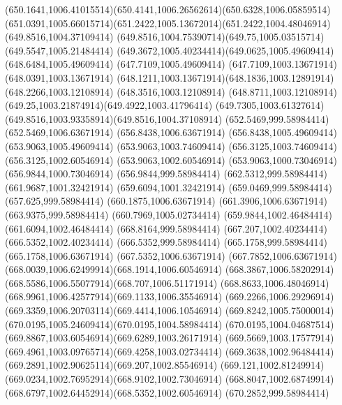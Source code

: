 {{	\curveto(650.1641,1006.41015514)(650.4141,1006.26562614)(650.6328,1006.05859514)
	\curveto(651.0391,1005.66015714)(651.2422,1005.13672014)(651.2422,1004.48046914)
	\closepath
	\moveto(649.8516,1004.37109414)
	\curveto(649.8516,1004.75390714)(649.75,1005.03515714)(649.5547,1005.21484414)
	\curveto(649.3672,1005.40234414)(649.0625,1005.49609414)(648.6484,1005.49609414)
	\lineto(647.7109,1005.49609414)
	\lineto(647.7109,1003.13671914)
	\lineto(648.0391,1003.13671914)
	\curveto(648.1211,1003.13671914)(648.1836,1003.12891914)(648.2266,1003.12108914)
	\lineto(648.3516,1003.12108914)
	\curveto(648.8711,1003.12108914)(649.25,1003.21874914)(649.4922,1003.41796414)
	\curveto(649.7305,1003.61327614)(649.8516,1003.93358914)(649.8516,1004.37108914)
	\closepath
	\moveto(652.5469,999.58984414)
	\lineto(652.5469,1006.63671914)
	\lineto(656.8438,1006.63671914)
	\lineto(656.8438,1005.49609414)
	\lineto(653.9063,1005.49609414)
	\lineto(653.9063,1003.74609414)
	\lineto(656.3125,1003.74609414)
	\lineto(656.3125,1002.60546914)
	\lineto(653.9063,1002.60546914)
	\lineto(653.9063,1000.73046914)
	\lineto(656.9844,1000.73046914)
	\lineto(656.9844,999.58984414)
	\closepath
	\moveto(662.5312,999.58984414)
	\lineto(661.9687,1001.32421914)
	\lineto(659.6094,1001.32421914)
	\lineto(659.0469,999.58984414)
	\lineto(657.625,999.58984414)
	\lineto(660.1875,1006.63671914)
	\lineto(661.3906,1006.63671914)
	\lineto(663.9375,999.58984414)
	\closepath
	\moveto(660.7969,1005.02734414)
	\lineto(659.9844,1002.46484414)
	\lineto(661.6094,1002.46484414)
	\closepath
	\moveto(668.8164,999.58984414)
	\lineto(667.207,1002.40234414)
	\lineto(666.5352,1002.40234414)
	\lineto(666.5352,999.58984414)
	\lineto(665.1758,999.58984414)
	\lineto(665.1758,1006.63671914)
	\lineto(667.5352,1006.63671914)
	\curveto(667.7852,1006.63671914)(668.0039,1006.62499914)(668.1914,1006.60546914)
	\curveto(668.3867,1006.58202914)(668.5586,1006.55077914)(668.707,1006.51171914)
	\curveto(668.8633,1006.48046914)(668.9961,1006.42577914)(669.1133,1006.35546914)
	\curveto(669.2266,1006.29296914)(669.3359,1006.20703114)(669.4414,1006.10546914)
	\curveto(669.8242,1005.75000014)(670.0195,1005.24609414)(670.0195,1004.58984414)
	\curveto(670.0195,1004.04687514)(669.8867,1003.60546914)(669.6289,1003.26171914)
	\curveto(669.5669,1003.17577914)(669.4961,1003.09765714)(669.4258,1003.02734414)
	\curveto(669.3638,1002.96484414)(669.2891,1002.90625114)(669.207,1002.85546914)
	\curveto(669.121,1002.81249914)(669.0234,1002.76952914)(668.9102,1002.73046914)
	\curveto(668.8047,1002.68749914)(668.6797,1002.64452914)(668.5352,1002.60546914)
	\lineto(670.2852,999.58984414)
}}
